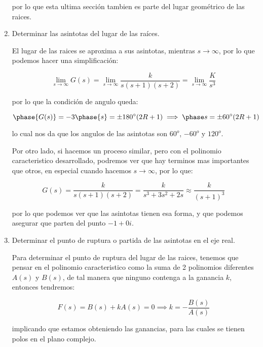 \begin{enumerate}
		por lo que esta ultima sección tambien es parte del lugar geométrico de las raices.

		\item Determinar las asintotas del lugar de las raíces.

		El lugar de las raices se aproxima a sus asintotas, mientras $s \to \infty$, por lo que podemos hacer una simplificación:

		\begin{equation*}
			\lim_{s \to \infty} G(s) = \lim_{s \to \infty} \frac{k}{s(s+1)(s+2)} = \lim_{s \to \infty} \frac{K}{s^3}
		\end{equation*}

		por lo que la condición de angulo queda:

		\begin{equation*}
			\phase{G(s)} = -3 \phase{s} = \pm 180^{\circ} (2R + 1) \implies \phase s = \pm 60^{\circ} (2R + 1)
		\end{equation*}

		lo cual nos da que los angulos de las asintotas son $60^o$, $-60^o$ y $120^o$.

		Por otro lado, si hacemos un proceso similar, pero con el polinomio caracteristico desarrollado, podremos ver que hay terminos mas importantes que otros, en especial cuando hacemos $s \to \infty$, por lo que:

		\begin{equation*}
			G(s) = \frac{k}{s(s+1)(s+2)} = \frac{k}{s^3 + 3 s^2 + 2 s} \approx \frac{k}{(s+1)^3}
		\end{equation*}

		por lo que podemos ver que las asintotas tienen esa forma, y que podemos asegurar que parten del punto $-1 + 0 i$.

		\item Determinar el punto de ruptura o partida de las asintotas en el eje real.

		Para determinar el punto de ruptura del lugar de las raices, tenemos que pensar en el polinomio caracteristico como la suma de 2 polinomios diferentes $A(s)$ y $B(s)$, de tal manera que ninguno contenga a la ganancia $k$, entonces tendremos:

		\begin{equation*}
			F(s) = B(s) + k A(s) = 0 \implies k = - \frac{B(s)}{A(s)}
		\end{equation*}

		implicando que estamos obteniendo las ganancias, para las cuales se tienen polos en el plano complejo.


\end{enumerate}
